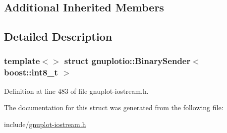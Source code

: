 \subsection*{Additional Inherited Members}


\subsection{Detailed Description}
\subsubsection*{template$<$$>$\newline
struct gnuplotio\+::\+Binary\+Sender$<$ boost\+::int8\+\_\+t $>$}



Definition at line 483 of file gnuplot-\/iostream.\+h.



The documentation for this struct was generated from the following file\+:\begin{DoxyCompactItemize}
\item 
include/\hyperlink{gnuplot-iostream_8h}{gnuplot-\/iostream.\+h}\end{DoxyCompactItemize}
